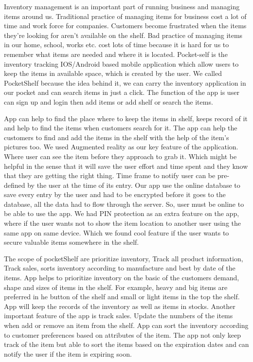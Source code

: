 
 \item Inventory management is an important part of running business and managing items around us. Traditional practice of managing items for business cost a lot of time and work force for companies. Customers become frustrated when the items they’re looking for aren’t available on the shelf. Bad practice of managing items in our home, school, works etc.  cost lots of time because it is hard for us to remember what items are needed and where it is located. Pocket-self is the inventory tracking IOS/Android based mobile application which allow users to keep the items in available space, which is created by the user. We called PocketShelf because the idea behind it, we can carry the inventory application in our pocket and can search items in just a click. The function of the app is user can sign up and login then add items or add shelf or search the items.
 
\item\item App can help to find the place where to keep the items in shelf, keeps record of it and help to find the items when customers search for it. The app can help the customers to find and add the items in the shelf with the help of the item’s pictures too. We used Augmented reality as our key feature of the application. Where user can see the item before they approach to grab it. Which might be helpful in the sense that it will save the user effort and time spent and they know that they are getting the right thing. Time frame to notify user can be pre-defined by the user at the time of its entry. Our app use the online database to save every entry by the user and had to be encrypted before it goes to the database, all the data had to flow through the server. So, user must be online to be able to use the app. We had PIN protection as an extra feature on the app, where if the user wants not to show the item location to another user using the same app on same device. Which we found cool feature if the user wants to secure valuable items somewhere in the shelf.

\item\item The scope of pocketShelf are prioritize inventory, Track all product information, Track sales, sorts inventory according to manufacture and best by date of the items. App helps to prioritize inventory on the basic of the customers demand, shape and sizes of items in the shelf. For example, heavy and big items are preferred in he button of the shelf and small or light items in the top the shelf. App will keep the records of the inventory as well as items in stocks. Another important feature of the app is track sales. Update the numbers of the items when add or remove an item from the shelf. App can sort the inventory according to customer preferences based on attributes of the item. The app not only keep track of the item but able to sort the items based on the expiration dates and can notify the user if the item is expiring soon.





